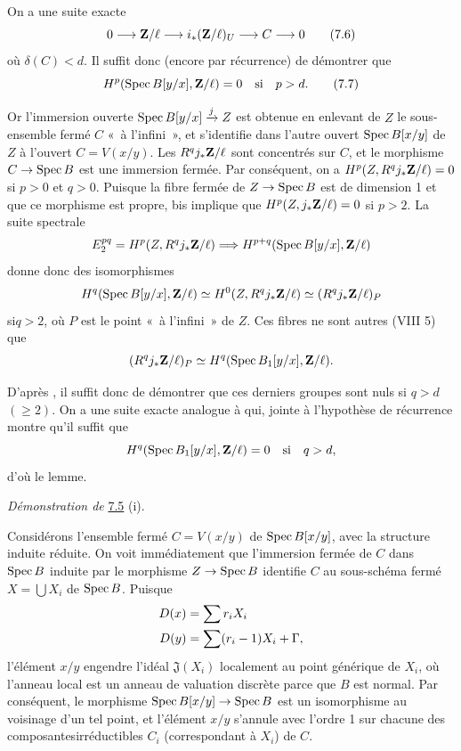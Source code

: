 \documentclass[10pt]{../fichiers-configuration-latex/smfart}
\begin{document}
On a une suite exacte
\begin{equation*}
0\longrightarrow \mathbf{Z}/\ell\longrightarrow
i_{\ast}(\mathbf{Z}/\ell)_{U}\longrightarrow C\longrightarrow 0\tag{7.6}
\end{equation*}
où $\delta(C)<d$. Il suffit donc (encore par récurrence) de démontrer
que
\begin{equation*}
H^{p}(\operatorname{Spec} B[y/x],\mathbf{Z}/\ell)=0\quad\text{\rm si}\quad
p>d{}.\tag{7.7}
\end{equation*}

Or l'immersion ouverte $\operatorname{Spec} B[y/x]\xrightarrow{j}Z$ est obtenue en
enlevant de $Z$ le sous-ensemble fermé $C$ « à l'infini », et
s'identifie dans l'autre ouvert $\operatorname{Spec} B[x/y]$ de $Z$ à l'ouvert
$C=V(x/y)$. Les $R^{q}j_{\ast}\mathbf{Z}/\ell$ sont concentrés sur
$C$, et le morphisme $C\rightarrow \operatorname{Spec} B$ est une immersion
fermée. Par conséquent, on a $H^{p}(Z,R^{q}j_{\ast}\mathbf{Z}/\ell)=0$
si $p>0$ et $q>0$. Puisque la fibre fermée de $Z\rightarrow \operatorname{Spec} B$ est
de dimension 1 et que ce morphisme est propre,  bis implique
que $H^{p}(Z,j_{\ast}\mathbf{Z}/\ell)=0$ si $p>2$. La suite spectrale
$$
E^{pq}_{2}=H^{p}(Z,R^{q}j_{\ast}\mathbf{Z}/\ell)\Longrightarrow
H^{p+q}(\operatorname{Spec} B[y/x],\mathbf{Z}/\ell)
$$
donne donc des isomorphismes
$$
H^{q}(\operatorname{Spec} B[y/x],\mathbf{Z}/\ell)\simeq
H^{0}(Z,R^{q}j_{\ast}\mathbf{Z}/\ell)\simeq
(R^{q}j_{\ast}\mathbf{Z}/\ell)_{P}
$$
si\pageoriginale $q>2$, où $P$ est le point « à l'infini » de
$Z$. Ces fibres ne sont autres (VIII 5) que
$$
(R^{q}j_{\ast}\mathbf{Z}/\ell)_{P}\simeq H^{q}(\operatorname{Spec}
B_{1}[y/x],\mathbf{Z}/\ell){}.
$$

D'après , il suffit donc de démontrer que ces derniers groupes sont
nuls si $q>d$ $(\geq 2)$. On a une suite exacte analogue à  qui,
jointe à l'hypothèse de récurrence montre qu'il suffit que
$$
H^{q}(\operatorname{Spec} B_{1}[y/x],\mathbf{Z}/\ell)=0\quad\mbox{\rm si}\quad
q>d{},
$$
d'où le lemme.

\medskip
\noindent
\emph{Démonstration de} \hyperref[XIX.lem7.5]{7.5} (i).

Considérons l'ensemble fermé $C=V(x/y)$ de $\operatorname{Spec} B[x/y]$, avec la
structure induite réduite. On voit immédiatement que l'immersion
fermée de $C$ dans $\operatorname{Spec} B$ induite par le morphisme $Z\rightarrow
\operatorname{Spec} B$ identifie $C$ au sous-schéma fermé $X=\bigcup X_{i}$ de
$\operatorname{Spec} B$. Puisque
\begin{align*}
D(x) &= \sum r_{i}X_{i}\\
D(y) &= \sum (r_{i}-1)X_{i}+\Gamma{},
\end{align*}
l'élément $x/y$ engendre l'idéal $\mathfrak{J}(X_{i})$ localement au
point générique de $X_{i}$, où l'anneau local est un anneau de
valuation discrète parce que $B$ est normal. Par conséquent, le
morphisme $\operatorname{Spec} B[x/y]\rightarrow \operatorname{Spec} B$ est un isomorphisme au
voisinage d'un tel point, et l'élément $x/y$ s'annule avec l'ordre 1
sur chacune des composantes\pageoriginale irréductibles $C_{i}$
(correspondant à $X_{i}$) de $C$.
\end{document}
